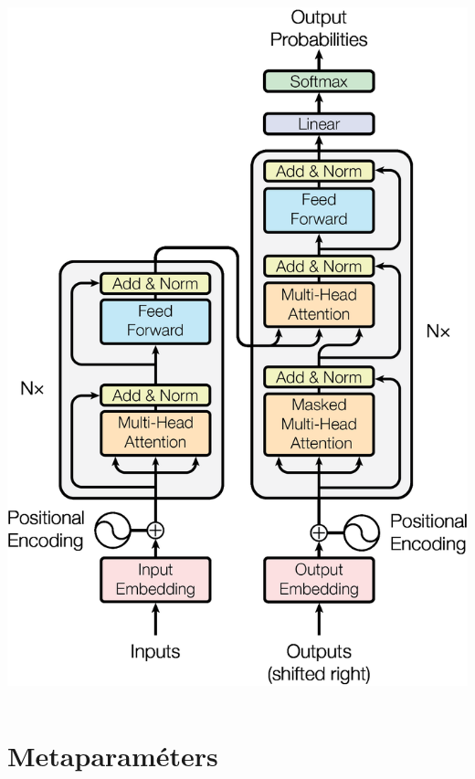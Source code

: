 \documentclass{beamer}
\begin{document}
\begin{frame}
\begin{columns}[c]
			\includegraphics[width=\textwidth]{1}
		\end{columns}
	
	
	\end{frame}

	\section{Metaparaméters}
\end{document}
